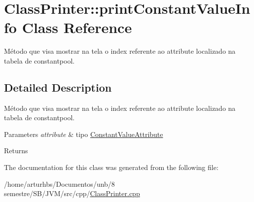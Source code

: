 \hypertarget{classClassPrinter_1_1printConstantValueInfo}{}\section{Class\+Printer\+:\+:print\+Constant\+Value\+Info Class Reference}
\label{classClassPrinter_1_1printConstantValueInfo}


Método que visa mostrar na tela o index referente ao attribute localizado na tabela de constantpool.  




\subsection{Detailed Description}
Método que visa mostrar na tela o index referente ao attribute localizado na tabela de constantpool. 


\begin{DoxyParams}{Parameters}
{\em attribute} & tipo \hyperlink{classConstantValueAttribute}{Constant\+Value\+Attribute} \\
\hline
\end{DoxyParams}
\begin{DoxyReturn}{Returns}

\end{DoxyReturn}


The documentation for this class was generated from the following file\+:\begin{DoxyCompactItemize}
\item 
/home/arturhbs/\+Documentos/unb/8 semestre/\+S\+B/\+J\+V\+M/src/cpp/\hyperlink{ClassPrinter_8cpp}{Class\+Printer.\+cpp}\end{DoxyCompactItemize}

